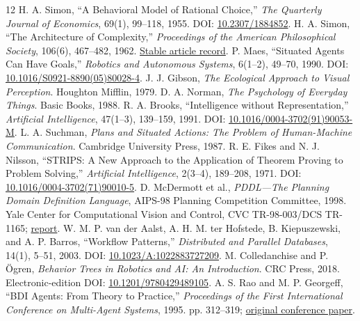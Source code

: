 \documentclass[11pt]{article}
\begin{document}
\begin{thebibliography}{12}
 H. A. Simon, ``A Behavioral Model of Rational Choice,'' \emph{The Quarterly Journal of Economics}, 69(1), 99--118, 1955. \newblock DOI: \href{https://doi.org/10.2307/1884852}{10.2307/1884852}.
 H. A. Simon, ``The Architecture of Complexity,'' \emph{Proceedings of the American Philosophical Society}, 106(6), 467--482, 1962. \newblock \href{https://www.jstor.org/stable/985254}{Stable article record}.
 P. Maes, ``Situated Agents Can Have Goals,'' \emph{Robotics and Autonomous Systems}, 6(1--2), 49--70, 1990. \newblock DOI: \href{https://doi.org/10.1016/S0921-8890(05)80028-4}{10.1016/S0921-8890(05)80028-4}.
 J. J. Gibson, \emph{The Ecological Approach to Visual Perception}. Houghton Mifflin, 1979.
 D. A. Norman, \emph{The Psychology of Everyday Things}. Basic Books, 1988.
 R. A. Brooks, ``Intelligence without Representation,'' \emph{Artificial Intelligence}, 47(1--3), 139--159, 1991. \newblock DOI: \href{https://doi.org/10.1016/0004-3702(91)90053-M}{10.1016/0004-3702(91)90053-M}.
 L. A. Suchman, \emph{Plans and Situated Actions: The Problem of Human-Machine Communication}. Cambridge University Press, 1987.
 R. E. Fikes and N. J. Nilsson, ``STRIPS: A New Approach to the Application of Theorem Proving to Problem Solving,'' \emph{Artificial Intelligence}, 2(3--4), 189--208, 1971. \newblock DOI: \href{https://doi.org/10.1016/0004-3702(71)90010-5}{10.1016/0004-3702(71)90010-5}.
 D. McDermott et al., \emph{PDDL---The Planning Domain Definition Language}, AIPS-98 Planning Competition Committee, 1998. \newblock Yale Center for Computational Vision and Control, CVC TR-98-003/DCS TR-1165; \href{https://www.cs.cmu.edu/~mmv/planning/readings/98aips-PDDL.pdf}{report}.
 W. M. P. van der Aalst, A. H. M. ter Hofstede, B. Kiepuszewski, and A. P. Barros, ``Workflow Patterns,'' \emph{Distributed and Parallel Databases}, 14(1), 5--51, 2003. \newblock DOI: \href{https://doi.org/10.1023/A:1022883727209}{10.1023/A:1022883727209}.
 M. Colledanchise and P. \"Ogren, \emph{Behavior Trees in Robotics and AI: An Introduction}. CRC Press, 2018. \newblock Electronic-edition DOI: \href{https://doi.org/10.1201/9780429489105}{10.1201/9780429489105}.
 A. S. Rao and M. P. Georgeff, ``BDI Agents: From Theory to Practice,'' \emph{Proceedings of the First International Conference on Multi-Agent Systems}, 1995. \newblock pp. 312--319; \href{https://cdn.aaai.org/ICMAS/1995/ICMAS95-042.pdf}{original conference paper}.
\end{thebibliography}
\end{document}
